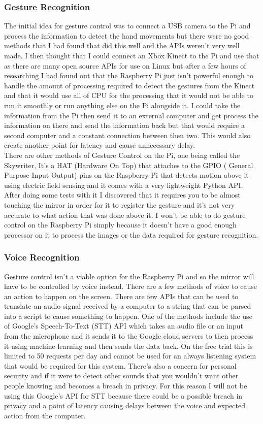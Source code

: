\documentclass[12pt]{article}
\begin{document}
        \subsubsection{Gesture Recognition}
            \noindent The initial idea for gesture control was to connect a USB camera to the Pi and process the information to detect the hand movements but there were no good methods that I had found that did this well and the APIs weren't very well made. I then thought that I could connect an Xbox Kinect to the Pi and use that as there are many open source APIs for use on Linux but after a few hours of researching I had found out that the Raspberry Pi just isn't powerful enough to handle the amount of processing required to detect the gestures from the Kinect and that it would use all of CPU for the processing that it would not be able to run it smoothly or run anything else on the Pi alongside it. I could take the information from the Pi then send it to an external computer and get process the information on there and send the information back but that would require a second computer and a constant connection between then two. This would also create another point for latency and cause unnecessary delay. \\
            \noindent There are other methods of Gesture Control on the Pi, one being called the Skywriter, It's a HAT (Hardware On Top) that attaches to the GPIO ( General Purpose Input Output) pins on the Raspberry Pi that detects motion above it using electric field sensing and it comes with a very lightweight Python API. After doing some tests with it I discovered that it requires you to be almost touching the mirror in order for it to register the gesture and it's not very accurate to what action that was done above it. I won't be able to do gesture control on the Raspberry Pi simply because it doesn't have a good enough processor on it to process the images or the data required for gesture recognition.
        \subsubsection{Voice Recognition}
            \noindent Gesture control isn't a viable option for the Raspberry Pi and so the mirror will have to be controlled by voice instead. There are a few methods of voice to cause an action to happen on the screen. There are few APIs that can be used to translate an audio signal received by a computer to a string that can be parsed into a script to cause something to happen. One of the methods include the use of Google's Speech-To-Text (STT) API which takes an audio file or an input from the microphone and it sends it to the Google cloud servers to then process it using machine learning and then sends the data back. On the free trial this is limited to 50 requests per day and cannot be used for an always listening system that would be required for this system. There's also a concern for personal security and if it were to detect other sounds that you wouldn't want other people knowing and becomes a breach in privacy. For this reason I will not be using this Google's API for STT because there could be a possible breach in privacy and a point of latency causing delays between the voice and expected action from the computer.
\end{document}
